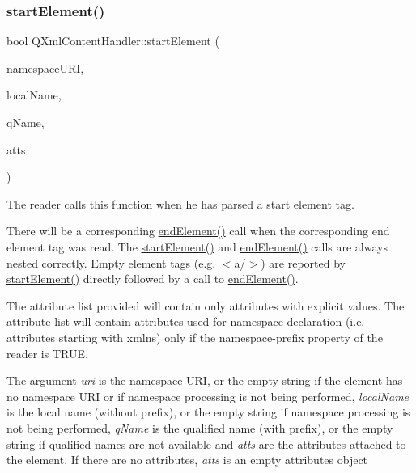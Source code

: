 \mbox{\label{class_q_xml_content_handler_af6d4e631fad2b9b75622c95003b1da55}} 
\subsubsection{\texorpdfstring{startElement()}{startElement()}}
{\footnotesize\ttfamily bool Q\+Xml\+Content\+Handler\+::start\+Element (\begin{DoxyParamCaption}\item[{const \mbox{\hyperlink{class_q_string}{Q\+String}} \&}]{namespace\+U\+RI,  }\item[{const \mbox{\hyperlink{class_q_string}{Q\+String}} \&}]{local\+Name,  }\item[{const \mbox{\hyperlink{class_q_string}{Q\+String}} \&}]{q\+Name,  }\item[{const \mbox{\hyperlink{class_q_xml_attributes}{Q\+Xml\+Attributes}} \&}]{atts }\end{DoxyParamCaption})\hspace{0.3cm}{\ttfamily [pure virtual]}}

The reader calls this function when he has parsed a start element tag.

There will be a corresponding \mbox{\hyperlink{class_q_xml_content_handler_af0abc06326798a6e522f91e6174b7b9e}{end\+Element()}} call when the corresponding end element tag was read. The \mbox{\hyperlink{class_q_xml_content_handler_af6d4e631fad2b9b75622c95003b1da55}{start\+Element()}} and \mbox{\hyperlink{class_q_xml_content_handler_af0abc06326798a6e522f91e6174b7b9e}{end\+Element()}} calls are always nested correctly. Empty element tags (e.\+g. $<$a/$>$) are reported by \mbox{\hyperlink{class_q_xml_content_handler_af6d4e631fad2b9b75622c95003b1da55}{start\+Element()}} directly followed by a call to \mbox{\hyperlink{class_q_xml_content_handler_af0abc06326798a6e522f91e6174b7b9e}{end\+Element()}}.

The attribute list provided will contain only attributes with explicit values. The attribute list will contain attributes used for namespace declaration (i.\+e. attributes starting with xmlns) only if the namespace-\/prefix property of the reader is T\+R\+UE.

The argument {\itshape uri} is the namespace U\+RI, or the empty string if the element has no namespace U\+RI or if namespace processing is not being performed, {\itshape local\+Name} is the local name (without prefix), or the empty string if namespace processing is not being performed, {\itshape q\+Name} is the qualified name (with prefix), or the empty string if qualified names are not available and {\itshape atts} are the attributes attached to the element. If there are no attributes, {\itshape atts} is an empty attributes object

